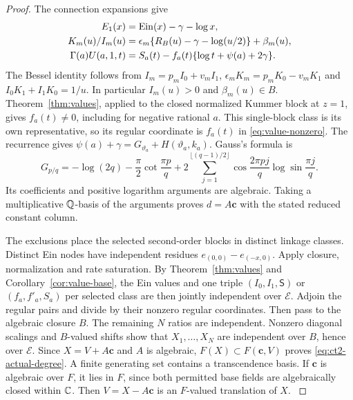 \begin{proof}\label{ct2:proof-start}
The connection expansions \cite[6.2.4, 10.28.2, 10.31.1, 13.2.9]{DLMF} give
\begin{align*}
 E_1(x)&=\operatorname{Ein}(x)-\gamma-\log x,\\
 K_m(u)/I_m(u)&=\epsilon_m\{R_B(u)-\gamma-\log(u/2)\}+\beta_m(u),\\
 \Gamma(a)U(a,1,t)&=S_a(t)-f_a(t)\{\log t+\psi(a)+2\gamma\}.
\end{align*}
The Bessel identity follows from $I_m=p_mI_0+v_mI_1$,
$\epsilon_mK_m=p_mK_0-v_mK_1$ and $I_0K_1+I_1K_0=1/u$.
In particular $I_m(u)>0$ and $\beta_m(u)\in B$.
Theorem~\ref{thm:values}, applied to the closed normalized Kummer block
at $z=1$, gives $f_a(t)\ne0$, including for negative rational $a$.
This single-block class is its own representative, so its regular
coordinate is $f_a(t)$ in \eqref{eq:value-nonzero}.
The recurrence gives $\psi(a)+\gamma=G_{\vartheta_a}+H(\vartheta_a,k_a)$.
Gauss's formula is
\begin{equation}\label{eq:ct2-gauss}
 G_{p/q}=-\log(2q)-\frac\pi2\cot\frac{\pi p}{q}
 +2\sum_{j=1}^{\lfloor(q-1)/2\rfloor}
       \cos\frac{2\pi pj}{q}\log\sin\frac{\pi j}{q}.
\end{equation}
Its coefficients and positive logarithm arguments are algebraic.
Taking a multiplicative $\mathbb{Q}$-basis of the arguments proves $d=A\mathbf c$
with the stated reduced constant column.

The exclusions place the selected second-order blocks in distinct linkage classes.
Distinct Ein nodes have independent residues $e_{(0,0)}-e_{(-x,0)}$.
Apply closure, normalization and rate saturation.
By Theorem~\ref{thm:values} and Corollary~\ref{cor:value-base}, the Ein values and one triple
$(I_0,I_1,\mathsf S)$ or $(f_a,f'_a,S_a)$ per selected class are then jointly independent
 over $\mathcal E$. Adjoin the regular pairs and divide by their nonzero
regular coordinates. Then pass to the algebraic closure $B$.
The remaining $N$ ratios are independent. Nonzero diagonal scalings and
$B$-valued shifts show that $X_1,\ldots,X_N$ are independent over $B$,
hence over $\mathcal E$.
Since $X=V+A\mathbf c$ and $A$ is algebraic, $F(X)\subset F(\mathbf c,V)$ proves
\eqref{eq:ct2-actual-degree}. A finite generating set contains a
transcendence basis. If $\mathbf c$ is algebraic over $F$, it lies in $F$,
since both permitted base fields are algebraically closed within $\mathbb{C}$.
Then $V=X-A\mathbf c$ is an $F$-valued translation of $X$.
\label{ct2:proof-end}
\end{proof}

